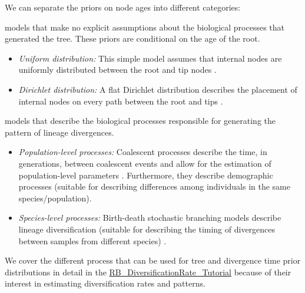 We can separate the priors on node ages into different categories:
\begin{description}[align=left]
\item [Phenomenological:] models that make no explicit assumptions about the biological processes that
generated the tree. These priors are conditional on the age of the root.
\begin{itemize}
\item \textit{Uniform distribution:} This simple model assumes that internal nodes are uniformly distributed
between the root and tip nodes \citep{Lepage2007,Ronquist2012}.
\item \textit{Dirichlet distribution:} A flat Dirichlet distribution describes the placement of internal nodes on
every path between the root and tips \citep{Kishino2001,Thorne2002}.
\end{itemize}
\item [Mechanistic:] models that describe the biological processes responsible for generating the pattern of
lineage divergences.
\begin{itemize}
\item \textit{Population-level processes:} Coalescent processes describe the time, in generations, between coalescent
events and allow for the estimation of population-level parameters \citep{Kingman1982}. Furthermore, they describe demographic processes (suitable for describing differences among individuals in the same species/population).
\item \textit{Species-level processes:} Birth-death stochastic branching models describe lineage diversification (suitable
for describing the timing of divergences between samples from different species) \citep{Kendall1948,Thompson1975,Nee1994b,Rannala1996, Yang1997,Hoehna2015a}.
\end{itemize}
\end{description}
We cover the different process that can be used for tree and divergence time prior distributions in detail in the  \href{https://github.com/revbayes/revbayes_tutorial/raw/master/tutorial_TeX/RB_DiversificationRate_Tutorial/RB_DiversificationRate_Tutorial.pdf}{RB\_DiversificationRate\_Tutorial} because of their interest in estimating diversification rates and patterns.


